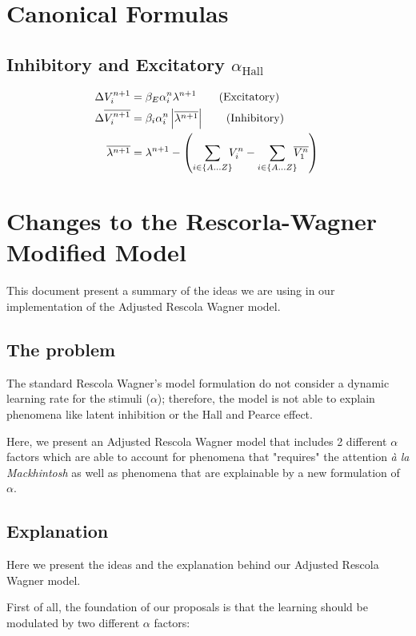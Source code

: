 \documentclass[11pt,a4paper]{article}
\newcommand{\alphahall}{\alpha _{\text{Hall}}}
\newcommand{\msp}{\hspace{-5pt}}
\begin{document}
\section*{Canonical Formulas}

\subsection{Inhibitory and Excitatory $\alphahall$}

\begin{align}
	\Delta V^{n + 1}_i &= \beta_E \alpha^n_i \lambda^{n + 1} \tag{Excitatory} \\
	\Delta \overline{V^{n + 1}_i} &= \beta_i \alpha^n_i \left| \overline{ \lambda^{n + 1} } \right| \tag{Inhibitory} \\
	\overline{ \lambda^{n + 1 } } &= \lambda^{n + 1} - \left( \sum_{i \in \{ A \dots Z \} } \msp V^n_i - \sum_{i \in \{ A \dots Z \} } \msp \overline{V^n_1} \right) \notag{}
\end{align}

\clearpage{}

\section*{Changes to the Rescorla-Wagner Modified Model}
This document present a summary of the ideas we are using in our implementation of the Adjusted Rescola Wagner model.

\subsection{The problem}
The standard Rescola Wagner's model formulation do not consider a dynamic learning rate for the stimuli ($\alpha$); therefore, the model is not able to explain phenomena like latent inhibition or the Hall and Pearce effect.

Here, we present an Adjusted Rescola Wagner model that includes 2 different $\alpha$ factors which are able to account for phenomena that "requires" the attention \textit{à la Mackhintosh} as well as phenomena that are explainable by a new formulation of $\alpha$.

\subsection{Explanation}
Here we present the ideas and the explanation behind our Adjusted Rescola Wagner model. 

First of all, the foundation of our proposals is that the learning should be modulated by two different $\alpha$ factors:
\end{document}
